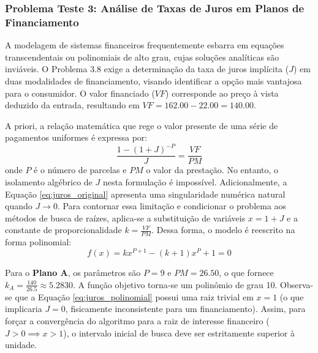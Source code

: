 
\subsubsection{Problema Teste 3: Análise de Taxas de Juros em Planos de Financiamento}
\label{subsubsec:problema_teste_3_bisseccao}

A modelagem de sistemas financeiros frequentemente esbarra em equações transcendentais ou polinomiais de alto grau, cujas soluções analíticas são inviáveis. O Problema 3.8 exige a determinação da taxa de juros implícita ($J$) em duas modalidades de financiamento, visando identificar a opção mais vantajosa para o consumidor. O valor financiado ($VF$) corresponde ao preço à vista deduzido da entrada, resultando em $VF = 162.00 - 22.00 = 140.00$.

A priori, a relação matemática que rege o valor presente de uma série de pagamentos uniformes é expressa por:
\begin{equation}
    \frac{1 - (1+J)^{-P}}{J} = \frac{VF}{PM}
    \label{eq:juros_original}
\end{equation}
onde $P$ é o número de parcelas e $PM$ o valor da prestação. No entanto, o isolamento algébrico de $J$ nesta formulação é impossível. Adicionalmente, a Equação \ref{eq:juros_original} apresenta uma singularidade numérica natural quando $J \to 0$. Para contornar essa limitação e condicionar o problema aos métodos de busca de raízes, aplica-se a substituição de variáveis $x = 1+J$ e a constante de proporcionalidade $k = \frac{VF}{PM}$. Dessa forma, o modelo é reescrito na forma polinomial:
\begin{equation}
    f(x) = kx^{P+1} - (k+1)x^P + 1 = 0
    \label{eq:juros_polinomial}
\end{equation}

Para o \textbf{Plano A}, os parâmetros são $P = 9$ e $PM = 26.50$, o que fornece $k_A = \frac{140}{26.5} \approx 5.2830$. A função objetivo torna-se um polinômio de grau 10. Observa-se que a Equação \ref{eq:juros_polinomial} possui uma raiz trivial em $x=1$ (o que implicaria $J=0$, fisicamente inconsistente para um financiamento). Assim, para forçar a convergência do algoritmo para a raiz de interesse financeiro ($J > 0 \implies x > 1$), o intervalo inicial de busca deve ser estritamente superior à unidade.

